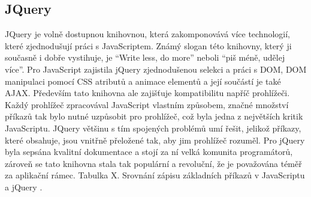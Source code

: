         \subsection{JQuery}
JQuery je volně dostupnou knihovnou, která zakomponovává více technologií, které zjednodušují práci s JavaScriptem. Známý slogan této knihovny, který ji současně i dobře vystihuje, je “Write less, do more” neboli “piš méně, udělej více”. Pro JavaScript zajistila jQuery zjednodušenou selekci a práci s DOM, DOM manipulaci pomocí CSS atributů a animace elementů a její součástí je také AJAX. Především tato knihovna ale zajišťuje kompatibilitu napříč prohlížeči. Každý prohlížeč zpracovával JavaScript vlastním způsobem, značné množství příkazů tak bylo nutné uzpůsobit pro prohlížeč, což byla jedna z největších kritik JavaScriptu. JQuery většinu s tím spojených problémů umí řešit, jelikož příkazy, které obsahuje, jsou vnitřně přeložené tak, aby jim prohlížeč rozuměl. Pro jQuery byla sepsána kvalitní dokumentace a stojí za ní velká komunita programátorů, zároveň se tato knihovna stala tak populární a revoluční, že je považována téměř za aplikační rámec.
Tabulka X. Srovnání zápisu základních příkazů v JavaScriptu a jQuery \cite{jquerybook}.

